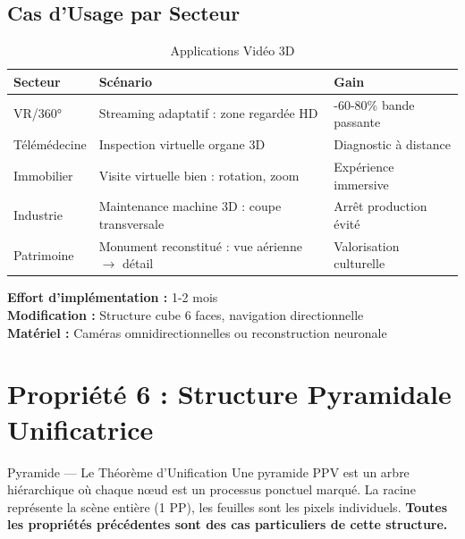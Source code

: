 \documentclass[12pt,a4paper]{article}
\begin{document}
	\subsection{Cas d'Usage par Secteur}
	
	\begin{table}[h]
		\centering
		\caption{Applications Vidéo 3D}
		\label{tab:video_3d}
		\begin{tabular}{@{}lll@{}}
			\toprule
			\textbf{Secteur} & \textbf{Scénario} & \textbf{Gain} \\ \midrule
			VR/360° & Streaming adaptatif : zone regardée HD & -60-80\% bande passante \\
			Télémédecine & Inspection virtuelle organe 3D & Diagnostic à distance \\
			Immobilier & Visite virtuelle bien : rotation, zoom & Expérience immersive \\
			Industrie & Maintenance machine 3D : coupe transversale & Arrêt production évité \\
			Patrimoine & Monument reconstitué : vue aérienne $\to$ détail & Valorisation culturelle \\
			\bottomrule
		\end{tabular}
	\end{table}
	
	\begin{techbox}
		\textbf{Effort d'implémentation :} 1-2 mois \\
		\textbf{Modification :} Structure cube 6 faces, navigation directionnelle \\
		\textbf{Matériel :} Caméras omnidirectionnelles ou reconstruction neuronale
	\end{techbox}
	
	\section{Propriété 6 : Structure Pyramidale Unificatrice}
	
	\begin{featurebox}{Pyramide — Le Théorème d'Unification}
		Une pyramide PPV est un arbre hiérarchique où chaque nœud est un processus ponctuel marqué. La racine représente la scène entière (1 PP), les feuilles sont les pixels individuels. \textbf{Toutes les propriétés précédentes sont des cas particuliers de cette structure.}
	\end{featurebox}
	
\end{document}
